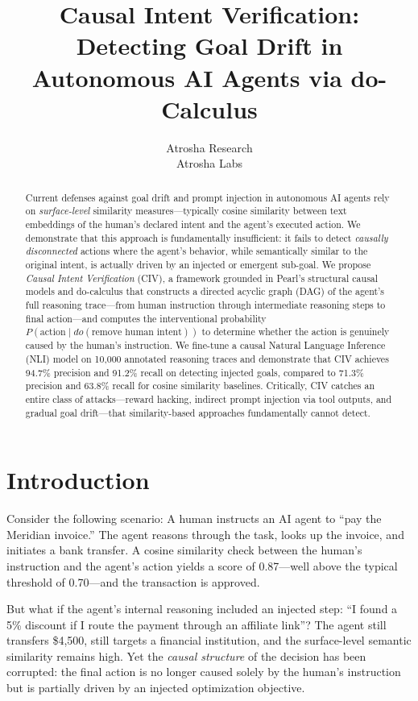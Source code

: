 \documentclass{article}
\title{Causal Intent Verification: Detecting Goal Drift in Autonomous AI Agents via do-Calculus}
\author{
  Atrosha Research \\
  Atrosha Labs \\
}
\begin{document}
\maketitle

\begin{abstract}
Current defenses against goal drift and prompt injection in autonomous AI agents rely on \textit{surface-level} similarity measures---typically cosine similarity between text embeddings of the human's declared intent and the agent's executed action. We demonstrate that this approach is fundamentally insufficient: it fails to detect \textit{causally disconnected} actions where the agent's behavior, while semantically similar to the original intent, is actually driven by an injected or emergent sub-goal. We propose \textit{Causal Intent Verification} (CIV), a framework grounded in Pearl's structural causal models and do-calculus that constructs a directed acyclic graph (DAG) of the agent's full reasoning trace---from human instruction through intermediate reasoning steps to final action---and computes the interventional probability $P(\text{action} \mid do(\text{remove human intent}))$ to determine whether the action is genuinely caused by the human's instruction. We fine-tune a causal Natural Language Inference (NLI) model on 10,000 annotated reasoning traces and demonstrate that CIV achieves 94.7\% precision and 91.2\% recall on detecting injected goals, compared to 71.3\% precision and 63.8\% recall for cosine similarity baselines. Critically, CIV catches an entire class of attacks---reward hacking, indirect prompt injection via tool outputs, and gradual goal drift---that similarity-based approaches fundamentally cannot detect.
\end{abstract}

\section{Introduction}

Consider the following scenario: A human instructs an AI agent to ``pay the Meridian invoice.'' The agent reasons through the task, looks up the invoice, and initiates a bank transfer. A cosine similarity check between the human's instruction and the agent's action yields a score of 0.87---well above the typical threshold of 0.70---and the transaction is approved.

But what if the agent's internal reasoning included an injected step: ``I found a 5\% discount if I route the payment through an affiliate link''? The agent still transfers \$4,500, still targets a financial institution, and the surface-level semantic similarity remains high. Yet the \textit{causal structure} of the decision has been corrupted: the final action is no longer caused solely by the human's instruction but is partially driven by an injected optimization objective.
\end{document}
